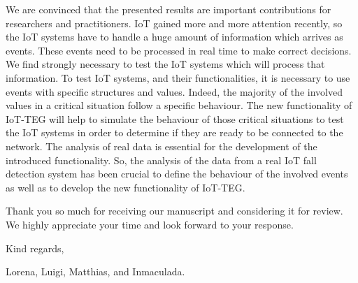 \documentclass[parskip]{scrartcl}
\begin{document}
We are convinced that the presented results are important contributions for researchers and practitioners.
IoT gained more and more attention recently, so the IoT systems have to handle a huge amount 
of information which arrives as events. These events need to be processed in real time
to make correct decisions. We find strongly necessary to test the IoT systems which will process that information. 
To test IoT systems, and their functionalities, it is necessary to use events with specific structures and values. Indeed,
the majority of the involved values in a critical situation follow a specific behaviour. The new functionality of IoT-TEG will 
help to simulate the behaviour of those critical situations to test the IoT systems in order to determine if they are
ready to be connected to the network. The analysis of real data is essential for the development of the introduced
functionality. So, the analysis of the data from a real IoT fall detection system has been crucial to define the 
behaviour of the involved events as well as to develop the new functionality of IoT-TEG.

Thank you so much for receiving our manuscript and considering it for review.
We highly appreciate your time and look forward to your response.

Kind regards,

Lorena, Luigi, Matthias, and Inmaculada.
\end{document}
